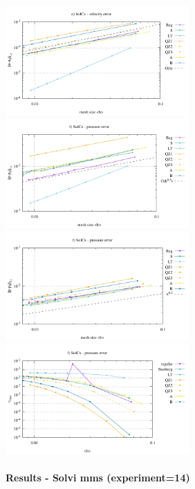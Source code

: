 \begin{center}
\includegraphics[width=7cm]{python_codes/fieldstone_78/results/mms_solcx/odd/errors_V}
\includegraphics[width=7cm]{python_codes/fieldstone_78/results/mms_solcx/odd/errors_P}\\
\includegraphics[width=7cm]{python_codes/fieldstone_78/results/mms_solcx/odd/errors_Q}
\includegraphics[width=7cm]{python_codes/fieldstone_78/results/mms_solcx/odd/vrms.pdf}
\end{center}

\newpage
\paragraph{Results - Solvi mms (experiment=14)}

